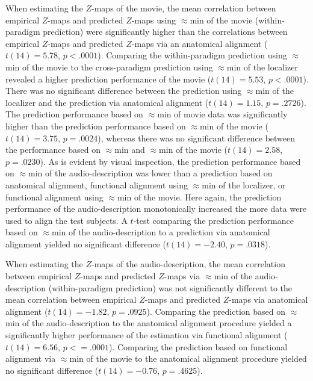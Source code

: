 %
When estimating the $Z$-maps of the movie, the mean correlation between
empirical $Z$-maps and predicted $Z$-maps using $\approx$\unit[15]{min} of the
movie (within-paradigm prediction) were significantly higher than the
correlations between empirical $Z$-maps and predicted $Z$-maps via an anatomical
alignment ($t(14)= 5.78$, $p<.0001$).
%
Comparing the within-paradigm prediction using $\approx$\unit[15]{min} of the
movie to the cross-paradigm prediction using $\approx$\unit[15]{min} of the
localizer revealed a higher prediction performance of the movie
($t(14)=5.53$, $p<.0001$).
%
There was no significant difference between the prediction using
$\approx$\unit[15]{min} of the localizer and the prediction via anatomical
alignment ($t(14)=1.15$, $p=.2726$).
%
The prediction performance based on $\approx$\unit[30]{min} of movie data was
significantly higher than the prediction performance based on
$\approx$\unit[15]{min} of the movie ($t(14)= 3.75$, $p=.0024$), whereas there
was no significant difference between the performance based on
$\approx$\unit[45]{min} and $\approx$\unit[30]{min} of the movie ($t(14)=2.58$,
$p=.0230$).
%
As is evident by visual inspection, the prediction performance based on
$\approx$\unit[15]{min} of the audio-description was lower than a prediction
based on anatomical alignment, functional alignment using
$\approx$\unit[15]{min} of the localizer, or functional alignment using
$\approx$\unit[15]{min} of the movie.
%
Here again, the prediction performance of the audio-description monotonically
increased the more data were used to align the test subjects.
%
A $t$-test comparing the prediction performance based on
$\approx$\unit[120]{min} of the audio-description to a prediction via anatomical
alignment yielded no significant difference ($t(14)=-2.40$, $p=.0318$).

%
When estimating the $Z$-maps of the audio-description, the mean correlation
between empirical $Z$-maps and predicted $Z$-maps via $\approx$\unit[15]{min} of
the audio-description (within-paradigm prediction) was not significantly
different to the mean correlation between empirical $Z$-maps and predicted
$Z$-maps via anatomical alignment ($t(14)=-1.82$, $p=.0925$).
%
Comparing the prediction based on $\approx$\unit[120]{min} of the
audio-description to the anatomical alignment procedure yielded a significantly
higher performance of the estimation via functional alignment ($t(14)=6.56$,
$p<=.0001$).
%
Comparing the prediction based on functional alignment via
$\approx$\unit[120]{min} of the movie to the anatomical alignment procedure
yielded no significant difference ($t(14)=-0.76$, $p=.4625$).



